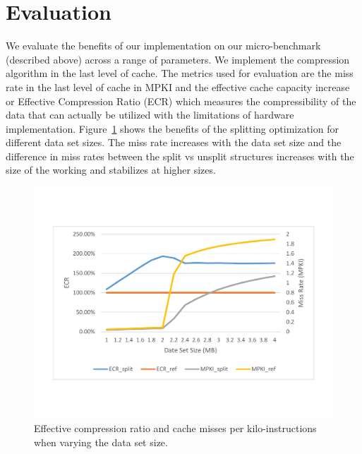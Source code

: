 \section{Evaluation}
\label{sec:eval}

We evaluate the benefits of our implementation on our micro-benchmark (described
above) across a range of parameters. We implement the compression algorithm in
the last level of cache. The metrics used for evaluation are the miss rate in
the last level of cache in MPKI and the effective cache capacity increase or
Effective Compression Ratio (ECR) which measures the compressibility of the data
that can actually be utilized with the limitations of hardware implementation.
Figure~\ref{fig:size} shows the benefits of the splitting optimization for different data
set sizes. The miss rate increases with the data set size and the difference in
miss rates between the split vs unsplit structures increases with the size of
the working and stabilizes at higher sizes.  

\begin{figure}[htb]
\centering
\includegraphics[trim=0mm 0mm 0mm 0mm,clip,width=1\linewidth]{figs/figure2.pdf}
\caption{Effective compression ratio and cache misses per kilo-instructions when
varying the data set size.}
\label{fig:size}
\end{figure}

